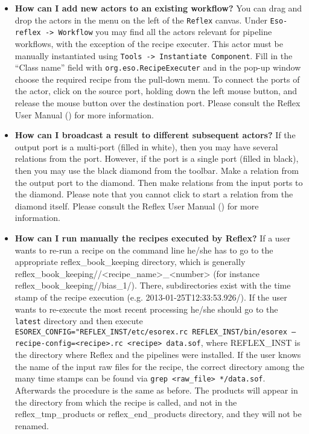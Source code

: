 \begin{itemize}
   \item {\bf How can I add new actors to an existing workflow?}
   You can drag and drop the actors in the menu on the left of the {\tt Reflex} 
   canvas. Under {\tt Eso-reflex -> Workflow} you may find all the actors
   relevant for pipeline workflows, with the exception of the recipe executer.
   This actor must be manually instantiated using
   {\tt Tools -> Instantiate Component}. Fill in the ``Class name'' field with 
   {\tt org.eso.RecipeExecuter} and in the pop-up window choose the required 
   recipe from the pull-down menu. To connect the ports of the actor, click on
   the source port, holding down the left mouse button, and release the mouse
   button over the destination port. Please consult the Reflex User Manual
   (\cite{REFLEXMAN}) for more information.

   \item {\bf How can I broadcast a result to different subsequent actors?}
   If the output port is a multi-port (filled in white), then you may have
   several relations from the port. However, if the port is a single port
   (filled in black), then you may use the black diamond from the toolbar.
   Make a relation from the output port to the diamond. Then make relations 
   from the input ports to the diamond. Please note that you cannot click to 
   start a relation from the diamond itself. Please consult the Reflex User 
   Manual (\cite{REFLEXMAN}) for more information.

   \item {\bf How can I run manually the recipes executed by Reflex?}
   If a user wants to re-run a recipe on the command line he/she has to go to
   the appropriate reflex\_book\_keeping directory, which is generally 
   reflex\_book\_keeping/\instname/<recipe\_name>\_<number> (for instance 
   reflex\_book\_keeping/\instname/bias\_1/). There, subdirectories exist with 
   the time stamp of the recipe execution (e.g. 2013-01-25T12:33:53.926/). 
   If the user wants to re-execute the most recent processing he/she should 
   go to the {\tt latest} directory and then execute 
   {\tt ESOREX\_CONFIG="REFLEX\_INST/etc/esorex.rc 
   REFLEX\_INST/bin/esorex --recipe-config=<recipe>.rc <recipe> data.sof}, 
   where REFLEX\_INST is the directory where Reflex and the pipelines were
   installed. If the user knows the name of the input raw files for the 
   recipe, the correct directory among the many time stamps can be found via 
   {\tt grep <raw\_file> */data.sof}. Afterwards the procedure is the same 
   as before. The products will appear in the directory from which the recipe
   is called, and not in the reflex\_tmp\_products or reflex\_end\_products
   directory, and they will not be renamed. 

\end{itemize}

